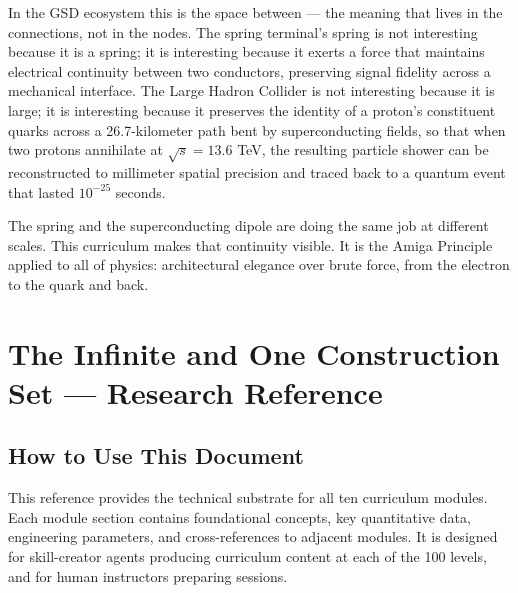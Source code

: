 \documentclass[11pt,letterpaper]{article}
\newcommand{\stageheader}[2]{%
  \noindent\colorbox{#2}{\makebox[\dimexpr\textwidth-2\fboxsep\relax][l]{%
    \textcolor{white}{\bfseries\sffamily\hspace{6pt}#1\hspace{6pt}}}}%
  \vspace{0.5em}\par%
}
\begin{document}
In the GSD ecosystem this is the space between --- the meaning that lives in the connections, not
in the nodes. The spring terminal's spring is not interesting because it is a spring; it is
interesting because it exerts a force that maintains electrical continuity between two conductors,
preserving signal fidelity across a mechanical interface. The Large Hadron Collider is not
interesting because it is large; it is interesting because it preserves the identity of a proton's
constituent quarks across a 26.7-kilometer path bent by superconducting fields, so that when two
protons annihilate at $\sqrt{s} = 13.6$ TeV, the resulting particle shower can be reconstructed to
millimeter spatial precision and traced back to a quantum event that lasted $10^{-25}$ seconds.

The spring and the superconducting dipole are doing the same job at different scales. This
curriculum makes that continuity visible. It is the Amiga Principle applied to all of physics:
architectural elegance over brute force, from the electron to the quark and back.

\newpage

\stageheader{STAGE 2 --- RESEARCH REFERENCE}{secondary}

\section{The Infinite and One Construction Set --- Research Reference}

\subsection{How to Use This Document}

This reference provides the technical substrate for all ten curriculum modules. Each module
section contains foundational concepts, key quantitative data, engineering parameters, and
cross-references to adjacent modules. It is designed for skill-creator agents producing curriculum
content at each of the 100 levels, and for human instructors preparing sessions.
\end{document}
